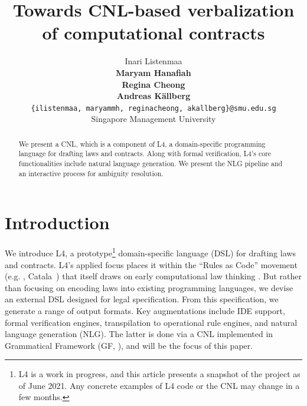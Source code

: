 \documentclass[11pt]{article}
\title{Towards CNL-based verbalization of computational contracts}
\author{Inari Listenmaa \\ {\bf Maryam Hanafiah} \\ {\bf Regina Cheong} \\ {\bf Andreas Källberg} \\
        \texttt{\{ilistenmaa,  maryammh, reginacheong, akallberg\}@smu.edu.sg} \\
         Singapore Management University}
\begin{document}
\maketitle

\begin{abstract}
We present a CNL, which is a component of L4, 
a domain-specific programming language for drafting laws and contracts.
Along with formal verification, L4's core functionalities include natural language generation.
We present the NLG pipeline and an interactive process for ambiguity resolution. 

\end{abstract}

\section{Introduction}
\label{sec:intro}
We introduce L4, a prototype\footnote{L4 is a work in progress, and this article presents a snapshot of the project as of June 2021. Any concrete examples of L4 code or the CNL may change in a few months.} 
domain-specific language (DSL) for drafting laws and contracts. 
L4's applied focus places it within the ``Rules as Code'' movement (e.g. \citet{openfisca_openfisca_nodate}, Catala~\cite{merigoux2021catala}) that itself draws on early computational law thinking \cite{sergot_british_1986, love_computational_2005}. But rather than focusing on encoding laws into existing programming languages, we devise an external DSL designed for legal specification. From this specification, we generate a range of output formats. 
Key augmentations include IDE support, formal verification engines, transpilation to operational rule engines, and natural language generation (NLG). 
The latter is done via a CNL implemented in Grammatical Framework (GF, \citeauthor{ranta_grammatical_2004} \citeyear{ranta_grammatical_2004}), and will be the focus of this paper.
\end{document}
